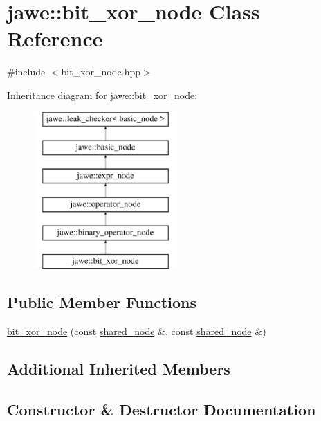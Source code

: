 \hypertarget{classjawe_1_1bit__xor__node}{}\section{jawe\+:\+:bit\+\_\+xor\+\_\+node Class Reference}
\label{classjawe_1_1bit__xor__node}


{\ttfamily \#include $<$bit\+\_\+xor\+\_\+node.\+hpp$>$}

Inheritance diagram for jawe\+:\+:bit\+\_\+xor\+\_\+node\+:\begin{figure}[H]
\begin{center}
\leavevmode
\includegraphics[height=6.000000cm]{classjawe_1_1bit__xor__node}
\end{center}
\end{figure}
\subsection*{Public Member Functions}
\begin{DoxyCompactItemize}
\item 
\hyperlink{classjawe_1_1bit__xor__node_a0c2e60807baf846ba1bba6c1a0564d48}{bit\+\_\+xor\+\_\+node} (const \hyperlink{namespacejawe_a3f307481d921b6cbb50cc8511fc2b544}{shared\+\_\+node} \&, const \hyperlink{namespacejawe_a3f307481d921b6cbb50cc8511fc2b544}{shared\+\_\+node} \&)
\end{DoxyCompactItemize}
\subsection*{Additional Inherited Members}


\subsection{Constructor \& Destructor Documentation}
\mbox{\label{classjawe_1_1bit__xor__node_a0c2e60807baf846ba1bba6c1a0564d48}} 
